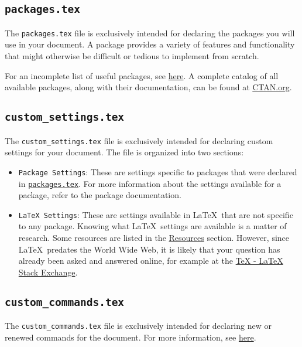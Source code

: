 \subsection{\texttt{packages.tex}}
\label{sec:packages.tex}

The \texttt{packages.tex} file is exclusively intended for declaring the packages you will use in your document. A package provides a variety of features and functionality that might otherwise be difficult or tedious to implement from scratch.

For an incomplete list of useful packages, see \href{https://en.wikibooks.org/wiki/LaTeX/Package_Reference}{here}. A complete catalog of all available packages, along with their documentation, can be found at \href{https://ctan.org/pkg}{CTAN.org}.

\subsection{\texttt{custom\_settings.tex}}
\label{sec:custom_settings.tex}

The \texttt{custom\_settings.tex} file is exclusively intended for declaring custom settings for your document. The file is organized into two sections:
\begin{itemize}
    \item \texttt{Package Settings}: These are settings specific to packages that were declared in \hyperref[sec:packages.tex]{\texttt{packages.tex}}. For more information about the settings available for a package, refer to the package documentation.
    \item \texttt{LaTeX Settings}: These are settings available in \LaTeX\ that are not specific to any package. Knowing what \LaTeX\ settings are available is a matter of research. Some resources are listed in the \hyperref[sec:resources]{Resources} section. However, since \LaTeX\ predates the World Wide Web, it is likely that your question has already been asked and answered online, for example at the \href{https://tex.stackexchange.com/}{TeX - LaTeX Stack Exchange}.
\end{itemize}

\subsection{\texttt{custom\_commands.tex}}
\label{sec:custom_commands.tex}

The \texttt{custom\_commands.tex} file is exclusively intended for declaring new or renewed commands for the document. For more information, see \href{https://en.wikibooks.org/wiki/LaTeX/Macros}{here}.

